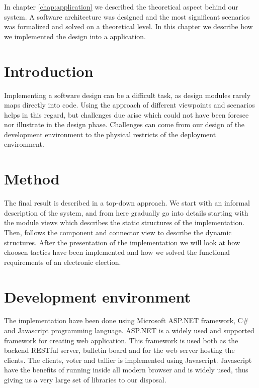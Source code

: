 In chapter \ref{chap:application} we described the theoretical aspect behind our system. A software architecture was designed and the most significant scenarios was formalized and solved on a theoretical level. In this chapter we describe how we implemented the design into a application.    

\section{Introduction}
Implementing a software design can be a difficult task, as design modules rarely maps directly into code. Using the approach of different viewpoints and scenarios helps in this regard, but challenges due arise which could not have been foresee nor illustrate in the design phase. Challenges can come from our design of the development environment to the physical restricts of the deployment environment. 

\section{Method}
The final result is described in a top-down approach. We start with an informal description of the system, and from here gradually go into details starting with the module views which describes the static structures of the implementation. Then, follows the component and connector view to describe the dynamic structures. After the presentation of the implementation we will look at how choosen tactics have been implemented and how we solved the functional requirements of an electronic election.

\section{Development environment}
The implementation have been done using Microsoft ASP.NET framework, C\# and Javascript programming language. ASP.NET is a widely used and supported framework for creating web application. This framework is used both as the backend RESTful server, bulletin board and for the web server hosting the clients. The clients, voter and tallier is implemented using Javascript. Javascript have the benefits of running inside all modern browser and is widely used, thus giving us a very large set of libraries to our disposal. \\



